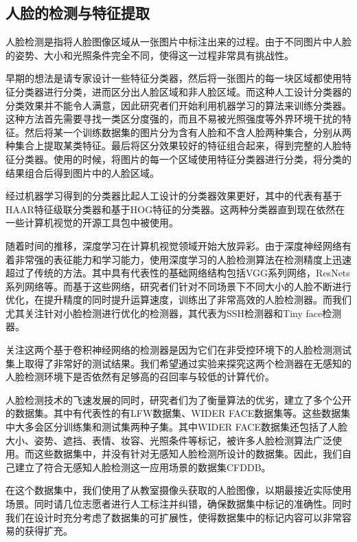 \subsection{人脸的检测与特征提取}

人脸检测是指将人脸图像区域从一张图片中标注出来的过程。由于不同图片中人脸的姿势、大小和光照条件完全不同，使得这一过程非常具有挑战性。

早期的想法是请专家设计一些特征分类器，然后将一张图片的每一块区域都使用特征分类器进行分类，进而区分出人脸区域和非人脸区域。而这种人工设计分类器的分类效果并不能令人满意，因此研究者们开始利用机器学习的算法来训练分类器。这种方法首先需要寻找一类区分度强的，而且不易被光照强度等外界环境干扰的特征。然后将某一个训练数据集的图片分为含有人脸和不含人脸两种集合，分别从两种集合上提取某类特征。最后将区分效果较好的特征组合起来，得到完整的人脸特征分类器。使用的时候，将图片的每一个区域使用特征分类器进行分类，将分类的结果组合后得到图片中的人脸区域。

经过机器学习得到的分类器比起人工设计的分类器效果更好，其中的代表有基于HAAR特征级联分类器\cite{viola2004robust}和基于HOG特征的分类器\cite{dalal2005histograms}。这两种分类器直到现在依然在一些计算机视觉的开源工具包中被使用。

随着时间的推移，深度学习在计算机视觉领域开始大放异彩。由于深度神经网络有着非常强的表征能力和学习能力，使用深度学习的人脸检测算法在检测精度上迅速超过了传统的方法。其中具有代表性的基础网络结构包括VGG系列网络\cite{simonyan2014very}，ResNets系列网络\cite{he2016deep}等。而基于这些网络，研究者们针对不同场景下不同大小的人脸不断进行优化，在提升精度的同时提升运算速度，训练出了非常高效的人脸检测器。而我们尤其关注针对小脸检测进行优化的检测器，其代表为SSH检测器\cite{najibi2017ssh}和Tiny face检测器\cite{hu2017finding}。

关注这两个基于卷积神经网络的检测器是因为它们在非受控环境下的人脸检测测试集上取得了非常好的测试结果。我们希望通过实验来探究这两个检测器在无感知的人脸检测环境下是否依然有足够高的召回率与较低的计算代价。

人脸检测技术的飞速发展的同时，研究者们为了衡量算法的优劣，建立了多个公开的数据集。其中有代表性的有LFW数据集\cite{huang2007labeled}、WIDER FACE数据集\cite{yang2016wider}等。这些数据集中大多会区分训练集和测试集两种子集。其中WIDER FACE数据集还包括了人脸大小、姿势、遮挡、表情、妆容、光照条件等标记，被许多人脸检测算法广泛使用。而这些数据集中，并没有针对无感知人脸检测所设计的数据集。因此，我们自己建立了符合无感知人脸检测这一应用场景的数据集CFDDB。

在这个数据集中，我们使用了从教室摄像头获取的人脸图像，以期最接近实际使用场景。同时请几位志愿者进行人工标注并纠错，确保数据集中标记的准确性。同时我们在设计时充分考虑了数据集的可扩展性，使得数据集中的标记内容可以非常容易的获得扩充。

